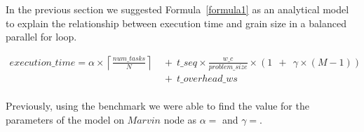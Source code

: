 In the previous section we suggested Formula~\ref{formula1} as an analytical model to explain the relationship between execution time and grain size in a balanced parallel for loop.   

\begin{equation}
\begin{aligned}
execution\_time = 
\alpha\times{\left\lceil{\frac{num\_{tasks}}{N}}\right\rceil}\:\:&+\:\:t\_{seq}\times{\frac{w\_c}{problem\_{size}}}\times{(1\:\:+\:\:\gamma\times{(M-1)})}\:\:\\
&+\:\:t\_{overhead\_{ws}}\\
\end{aligned}
\end{equation}

Previously, using the benchmark we were able to find the value for the parameters of the model on $Marvin$ node as $\alpha=$ and $\gamma=$. 






\vspace{\baselineskip}
%




\vspace{\baselineskip}

\clearpage

